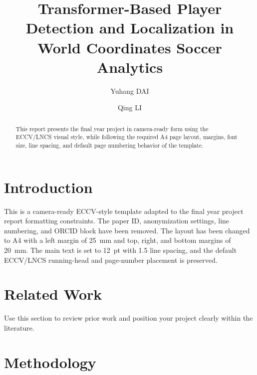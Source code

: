 \documentclass[runningheads]{llncs}
\begin{document}
\title{Transformer-Based Player Detection and Localization in World Coordinates Soccer Analytics}


\author{Yuhang DAI \and Qing LI}



\maketitle

\begin{abstract}
This report presents the final year project in camera-ready form using the ECCV/LNCS visual style, while following the required A4 page layout, margins, font size, line spacing, and default page numbering behavior of the template.
\end{abstract}

\section{Introduction}
\label{sec:intro}

This is a camera-ready ECCV-style template adapted to the final year project report formatting constraints. The paper ID, anonymization settings, line numbering, and ORCID block have been removed. The layout has been changed to A4 with a left margin of 25~mm and top, right, and bottom margins of 20~mm. The main text is set to 12~pt with 1.5 line spacing, and the default ECCV/LNCS running-head and page-number placement is preserved.

\section{Related Work}

Use this section to review prior work and position your project clearly within the literature.

\section{Methodology}
\end{document}
